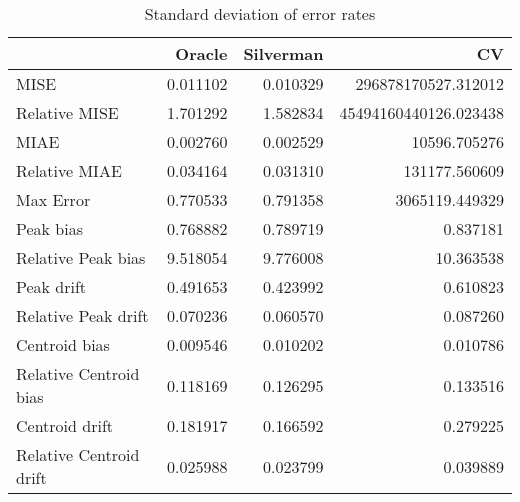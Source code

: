 \begin{table}[ht]
\centering
\begin{tabular}{lrrr}
  \hline
 & Oracle & Silverman & CV \\ 
  \hline
MISE & 0.011102 & 0.010329 & 296878170527.312012 \\ 
  Relative MISE & 1.701292 & 1.582834 & 45494160440126.023438 \\ 
  MIAE & 0.002760 & 0.002529 & 10596.705276 \\ 
  Relative MIAE & 0.034164 & 0.031310 & 131177.560609 \\ 
  Max Error & 0.770533 & 0.791358 & 3065119.449329 \\ 
  Peak bias & 0.768882 & 0.789719 & 0.837181 \\ 
  Relative Peak bias & 9.518054 & 9.776008 & 10.363538 \\ 
  Peak drift & 0.491653 & 0.423992 & 0.610823 \\ 
  Relative Peak drift & 0.070236 & 0.060570 & 0.087260 \\ 
  Centroid bias & 0.009546 & 0.010202 & 0.010786 \\ 
  Relative Centroid bias & 0.118169 & 0.126295 & 0.133516 \\ 
  Centroid drift & 0.181917 & 0.166592 & 0.279225 \\ 
  Relative Centroid drift & 0.025988 & 0.023799 & 0.039889 \\ 
   \hline
\end{tabular}
\caption{Standard deviation of error rates} 
\label{tbl:stddev_error_rates}
\end{table}
